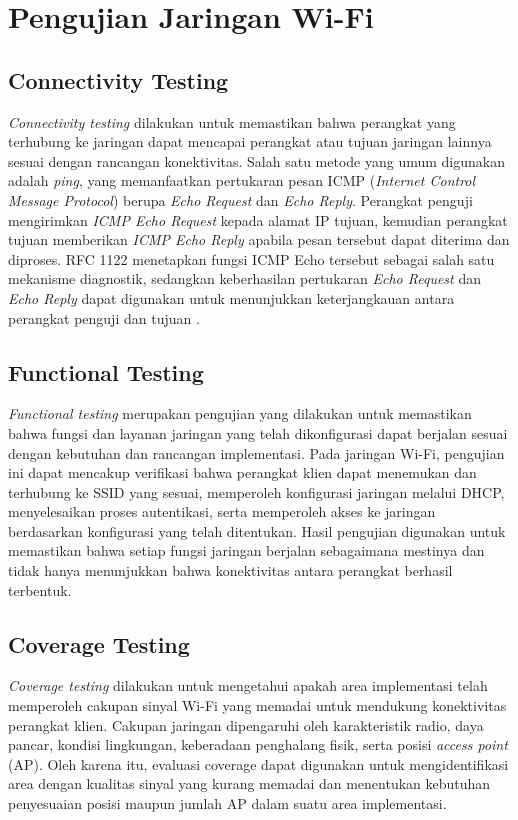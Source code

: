 \section{Pengujian Jaringan Wi-Fi}

\subsection{Connectivity Testing}

\textit{Connectivity testing} dilakukan untuk memastikan bahwa perangkat yang terhubung ke jaringan dapat mencapai perangkat atau tujuan jaringan lainnya sesuai dengan rancangan konektivitas. Salah satu metode yang umum digunakan adalah \textit{ping}, yang memanfaatkan pertukaran pesan ICMP (\textit{Internet Control Message Protocol}) berupa \textit{Echo Request} dan \textit{Echo Reply}. Perangkat penguji mengirimkan \textit{ICMP Echo Request} kepada alamat IP tujuan, kemudian perangkat tujuan memberikan \textit{ICMP Echo Reply} apabila pesan tersebut dapat diterima dan diproses. RFC 1122 menetapkan fungsi ICMP Echo tersebut sebagai salah satu mekanisme diagnostik, sedangkan keberhasilan pertukaran \textit{Echo Request} dan \textit{Echo Reply} dapat digunakan untuk menunjukkan keterjangkauan antara perangkat penguji dan tujuan \parencite{RFC1122}.

\subsection{Functional Testing}

\textit{Functional testing} merupakan pengujian yang dilakukan untuk memastikan bahwa fungsi dan layanan jaringan yang telah dikonfigurasi dapat berjalan sesuai dengan kebutuhan dan rancangan implementasi. Pada jaringan Wi-Fi, pengujian ini dapat mencakup verifikasi bahwa perangkat klien dapat menemukan dan terhubung ke SSID yang sesuai, memperoleh konfigurasi jaringan melalui DHCP, menyelesaikan proses autentikasi, serta memperoleh akses ke jaringan berdasarkan konfigurasi yang telah ditentukan. Hasil pengujian digunakan untuk memastikan bahwa setiap fungsi jaringan berjalan sebagaimana mestinya dan tidak hanya menunjukkan bahwa konektivitas antara perangkat berhasil terbentuk.

\subsection{Coverage Testing}

\textit{Coverage testing} dilakukan untuk mengetahui apakah area implementasi telah memperoleh cakupan sinyal Wi-Fi yang memadai untuk mendukung konektivitas perangkat klien. Cakupan jaringan dipengaruhi oleh karakteristik radio, daya pancar, kondisi lingkungan, keberadaan penghalang fisik, serta posisi \textit{access point} (AP). Oleh karena itu, evaluasi coverage dapat digunakan untuk mengidentifikasi area dengan kualitas sinyal yang kurang memadai dan menentukan kebutuhan penyesuaian posisi maupun jumlah AP dalam suatu area implementasi.

